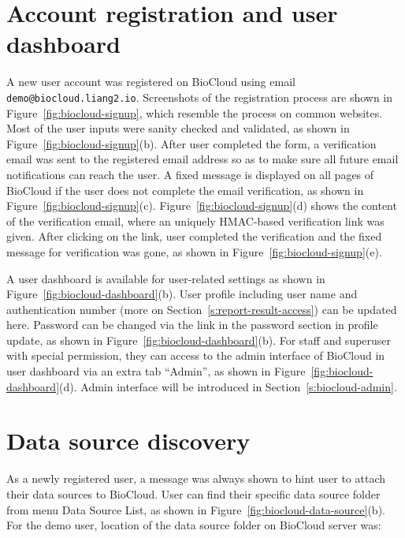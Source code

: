 \section{Account registration and user dashboard}

A new user account was registered on BioCloud using email
\texttt{demo@biocloud.liang2.io}. Screenshots of the registration process are
shown in Figure~\ref{fig:biocloud-signup}, which resemble the process on common
websites. Most of the user inputs were sanity checked and validated, as shown
in Figure~\ref{fig:biocloud-signup}(b). After user completed the form, a
verification email was sent to the registered email address so as to make sure
all future email notifications can reach the user. A fixed message is displayed
on all pages of BioCloud if the user does not complete the email verification,
as shown in Figure~\ref{fig:biocloud-signup}(c).
Figure~\ref{fig:biocloud-signup}(d) shows the content of the verification
email, where an uniquely HMAC-based verification link was given. After clicking
on the link, user completed the verification and the fixed message for
verification was gone, as shown in Figure~\ref{fig:biocloud-signup}(e).



A user dashboard is available for user-related settings as shown in
Figure~\ref{fig:biocloud-dashboard}(b). User profile including user name and
authentication number (more on Section~\ref{s:report-result-access}) can be
updated here. Password can be changed via the link in the password section in
profile update, as shown in Figure~\ref{fig:biocloud-dashboard}(b). For staff
and superuser with special permission, they can access to the admin interface
of BioCloud in user dashboard via an extra tab ``Admin'', as shown in
Figure~\ref{fig:biocloud-dashboard}(d). Admin interface will be introduced in
Section~\ref{s:biocloud-admin}.





\section{Data source discovery}

As a newly registered user, a message was always shown to hint user to attach
their data sources to BioCloud. User can find their specific data source folder
from menu Data Source \textrightarrow List, as shown in
Figure~\ref{fig:biocloud-data-source}(b). For the demo user, location of the
data source folder on BioCloud server was:

